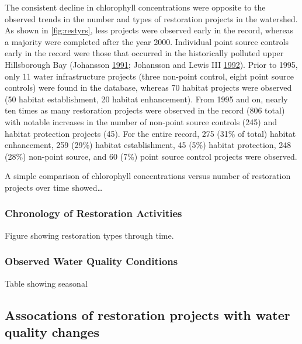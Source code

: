 \documentclass[]{article}
\begin{document}
The consistent decline in chlorophyll concentrations were opposite to
the observed trends in the number and types of restoration projects in
the watershed. As shown in \cref{fig:restyrs}, less projects were
observed early in the record, whereas a majority were completed after
the year 2000. Individual point source controls early in the record were
those that occurred in the historically polluted upper Hillsborough Bay
(Johansson \protect\hyperlink{ref-Johansson91}{1991}; Johansson and
Lewis III \protect\hyperlink{ref-Johansson92}{1992}). Prior to 1995,
only 11 water infrastructure projects (three non-point control, eight
point source controls) were found in the database, whereas 70 habitat
projects were observed (50 habitat establishment, 20 habitat
enhancement). From 1995 and on, nearly ten times as many restoration
projects were observed in the record (806 total) with notable increases
in the number of non-point source controls (245) and habitat protection
projects (45). For the entire record, 275 (31\% of total) habitat
enhancement, 259 (29\%) habitat establishment, 45 (5\%) habitat
protection, 248 (28\%) non-point source, and 60 (7\%) point source
control projects were observed.

A simple comparison of chlorophyll concentrations versus number of
restoration projects over time showed\ldots{}

\hypertarget{chronology-of-restoration-activities}{%
\subsubsection{Chronology of Restoration
Activities}\label{chronology-of-restoration-activities}}

Figure showing restoration types through time.

\hypertarget{observed-water-quality-conditions}{%
\subsubsection{Observed Water Quality
Conditions}\label{observed-water-quality-conditions}}

Table showing seasonal

\hypertarget{assocations-of-restoration-projects-with-water-quality-changes}{%
\subsection{Assocations of restoration projects with water quality
changes}\label{assocations-of-restoration-projects-with-water-quality-changes}}
\end{document}
